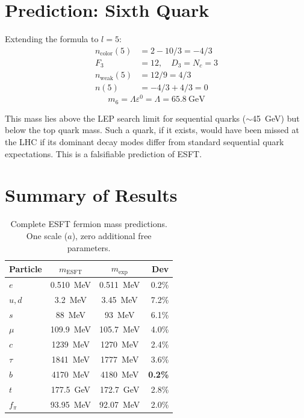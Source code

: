 ﻿\documentclass[twocolumn,preprintnumbers,amsmath,amssymb,prd]{revtex4-2}
\newcommand{\koppa}{\text{\usefont{T1}{lmr}{m}{n}\symbol{"DE}}}%
\renewcommand{\koppa}{a}%
\begin{document}
\section{Prediction: Sixth Quark}
\label{sec:prediction}

Extending the formula to $l=5$:
\begin{align}
n_{\text{color}}(5) &= 2 - 10/3 = -4/3 \\
F_3 &= 12, \quad D_3 = N_c = 3 \\
n_{\text{weak}}(5) &= 12/9 = 4/3 \\
n(5) &= -4/3 + 4/3 = 0
\end{align}
\begin{equation}
\boxed{m_6 = \Lambda\varepsilon^0 = \Lambda = 65.8~\text{GeV}}
\end{equation}

This mass lies above the LEP search limit for sequential quarks ($\sim$45~GeV) but below the top quark mass. Such a quark, if it exists, would have been missed at the LHC if its dominant decay modes differ from standard sequential quark expectations. This is a falsifiable prediction of ESFT.

\section{Summary of Results}
\label{sec:summary}

\begin{table}[h]
\caption{Complete ESFT fermion mass predictions. One scale ($\koppa$), zero additional free parameters.}
\label{tab:all}
\begin{ruledtabular}
\begin{tabular}{lccr}
Particle & $m_{\text{ESFT}}$ & $m_{\text{exp}}$ & Dev \\
\hline
$e$ & 0.510~MeV & 0.511~MeV & 0.2\% \\
$u,d$ & 3.2~MeV & 3.45~MeV & 7.2\% \\
$s$ & 88~MeV & 93~MeV & 6.1\% \\
$\mu$ & 109.9~MeV & 105.7~MeV & 4.0\% \\
$c$ & 1239~MeV & 1270~MeV & 2.4\% \\
$\tau$ & 1841~MeV & 1777~MeV & 3.6\% \\
$b$ & 4170~MeV & 4180~MeV & \textbf{0.2\%} \\
$t$ & 177.5~GeV & 172.7~GeV & 2.8\% \\
\hline
$f_\pi$ & 93.95~MeV & 92.07~MeV & 2.0\% \\
\end{tabular}
\end{ruledtabular}
\end{table}
\end{document}
